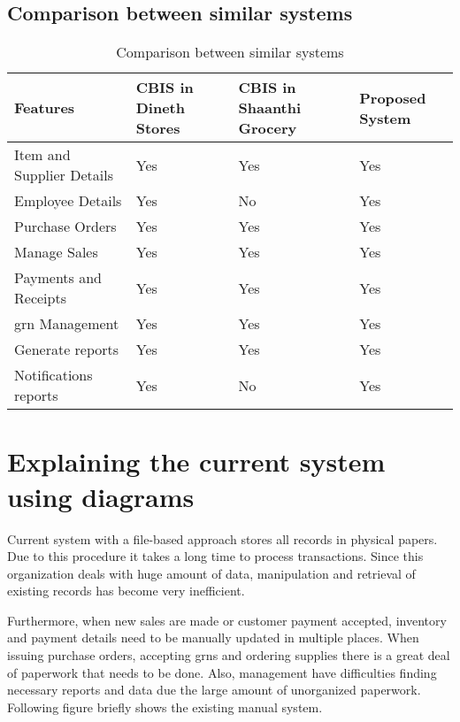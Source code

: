 \documentclass[12pt]{report}
\begin{document}
\subsection{Comparison between similar systems}
\begin{table}[H]
	\centering
	\begin{tabular}{ |p{4.5cm}|p{3cm}|p{3cm}|p{2cm}| }
		\hline
		\bf{Features}             & \bf{CBIS in Dineth Stores} & \bf{CBIS in Shaanthi Grocery} & \bf{Proposed System} \\
		\hline
		Item and Supplier Details & Yes                        & Yes                           & Yes                  \\
		\hline
		Employee Details          & Yes                        & No                            & Yes                  \\
		\hline
		Purchase Orders           & Yes                        & Yes                           & Yes                  \\
		\hline
		Manage Sales              & Yes                        & Yes                           & Yes                  \\
		\hline
		Payments and Receipts     & Yes                        & Yes                           & Yes                  \\
		\hline
		\acrshort{grn} Management & Yes                        & Yes                           & Yes                  \\
		\hline
		Generate reports          & Yes                        & Yes                           & Yes                  \\
		\hline
		Notifications reports     & Yes                        & No                            & Yes                  \\
		\hline
	\end{tabular}
	\caption{Comparison between similar systems}
\end{table}

\section{Explaining the current system using diagrams}
Current system with a file-based approach stores all records in physical papers. Due to this procedure it takes a long time to process transactions. Since this organization deals with huge amount of data, manipulation and retrieval of existing records has become very inefficient.

Furthermore, when new sales are made or customer payment accepted, inventory and payment details need to be manually updated in multiple places. When issuing purchase orders, accepting \acrshort{grn}s and ordering supplies there is a great deal of paperwork that needs to be done. Also, management have difficulties finding  necessary reports and data due the large amount of unorganized paperwork. Following figure briefly shows the existing manual system.
\end{document}
